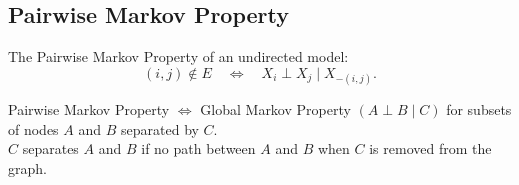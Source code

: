 \documentclass[12pt]{book}
\theoremstyle{definition}
\theoremstyle{remark}
\begin{document}
\subsection{Pairwise Markov Property}
The Pairwise Markov Property of an undirected model:
\[
(i, j) \notin E \quad \iff \quad X_i \perp X_j \mid X_{-(i,j)}.
\]

Pairwise Markov Property \(\iff\) Global Markov Property $(A \perp B \mid C)$
for subsets of nodes \( A \) and \( B \) separated by \( C \).\\

\( C \) separates \( A \) and \( B \) if no path between \( A \) and \( B \) when \( C \) is removed from the graph.\\


\paragraph{}
\begin{center}
\end{center}
\end{document}
